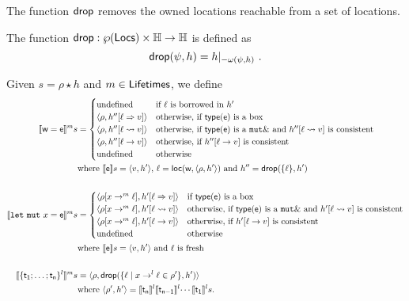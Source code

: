 The function $\drop$ removes the owned locations reachable from a set of locations.
%
\begin{definition}[Drop]\label{def:drop}
  The function $\drop:\wp(\Locs)\times\mathbb{H}\to\mathbb{H}$ is defined as
  \[
  \drop(\psi,h)=h|_{-{\omega(\psi,h)}}~.
  \]
\end{definition}

\begin{definition}\label{def:semantics_terms}
  Given $s=\rho\star h$ and $m\in\Lifetimes$, we define
  \begin{align*}
    \denl[\mathsf{w}=\mathsf{e}]{m}{s}&=
    \begin{cases}
      \text{undefined} & \text{if $\ell$ is borrowed in $h'$}\\
      \langle\rho,h''[\ell\Rightarrow v]\rangle & \text{otherwise, if $\type(\mathsf{e})$ is a box}\\
      \langle\rho,h''[\ell\leadsto v]\rangle & \text{otherwise, if $\type(\mathsf{e})$ is a $\mathtt{mut}\borrow$ and $h''[\ell\leadsto v]$ is consistent}\\
      \langle\rho,h''[\ell\to v]\rangle & \text{otherwise, if $h''[\ell\to v]$ is consistent}\\
      \text{undefined} & \text{otherwise}
    \end{cases}\\
    &\text{where $\den[\mathsf{e}]{s}=\langle v,h'\rangle$, $\ell=\loc(\mathsf{w},\langle\rho,h'\rangle)$ and
      $h''=\drop(\{\ell\},h')$}\\
    \mbox{}\\
    \denl[\mathtt{let\ mut}\ x=\mathsf{e}]{m}{s}&=
    \begin{cases}
      \langle\rho[x\to^m\ell],h'[\ell\Rightarrow v]\rangle & \text{if $\type(\mathsf{e})$ is a box}\\
      \langle\rho[x\to^m\ell],h'[\ell\leadsto v]\rangle & \text{otherwise, if $\type(\mathsf{e})$ is a $\mathtt{mut}\borrow$ and $h'[\ell\leadsto v]$ is consistent}\\
      \langle\rho[x\to^m\ell],h'[\ell\to v]\rangle & \text{otherwise, if $h'[\ell\to v]$ is consistent}\\
      \text{undefined} & \text{otherwise}
    \end{cases}\\
    &\text{where $\den[\mathsf{e}]{s}=\langle v,h'\rangle$ and $\ell$ is fresh}\\
    \mbox{}\\
    \denl[\{\mathsf{t_1};\ldots;\mathsf{t_n}\}^l]{m}{s}&=\langle\rho,\drop(\{\ell\mid x\to^l\ell\in\rho'\},h')\rangle\\
    &\text{where $\langle\rho',h'\rangle=\denl[\mathsf{t_n}]{l}{\denl[\mathsf{t_{n-1}}]{l}{\cdots\denl[\mathsf{t_1}]{l}{s}}}$.}
  \end{align*}
\end{definition}

